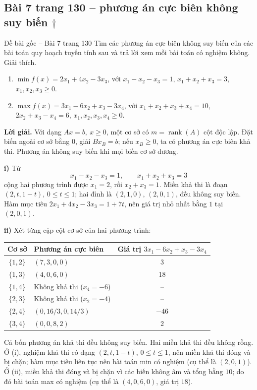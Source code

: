 \documentclass[11pt,a4paper]{article}
\begin{document}
\clearpage
\subsection{Bài 7 trang 130 -- phương án cực biên không suy biến \(\dagger\)}
\begin{questionbox}{Đề bài gốc -- Bài 7 trang 130}
Tìm các phương án cực biên không suy biến của các bài toán quy hoạch tuyến tính sau và trả lời xem mỗi bài toán có nghiệm không. Giải thích.
\begin{enumerate}[label=\roman*),nosep,leftmargin=*]
\item \(\min f(x)=2x_1+4x_2-3x_3\), với \(x_1-x_2-x_3=1\), \(x_1+x_2+x_3=3\), \(x_1,x_2,x_3\ge0\).
\item \(\max f(x)=3x_1-6x_2+x_3-3x_4\), với \(x_1+x_2+x_3+x_4=10\), \(2x_2+x_3-x_4=6\), \(x_1,x_2,x_3,x_4\ge0\).
\end{enumerate}
\end{questionbox}
\textbf{Lời giải.} Với dạng \(Ax=b,\ x\ge0\), một cơ sở có \(m=\operatorname{rank}(A)\) cột độc lập. Đặt biến ngoài cơ sở bằng \(0\), giải \(Bx_B=b\); nếu \(x_B\ge0\), ta có phương án cực biên khả thi. Phương án không suy biến khi mọi biến cơ sở dương.

\textbf{i)} Từ
\[
x_1-x_2-x_3=1,\qquad x_1+x_2+x_3=3
\]
cộng hai phương trình được \(x_1=2\), rồi \(x_2+x_3=1\). Miền khả thi là đoạn \((2,t,1-t)\), \(0\le t\le1\); hai đỉnh là \((2,1,0)\), \((2,0,1)\), đều không suy biến. Hàm mục tiêu \(2x_1+4x_2-3x_3=1+7t\), nên giá trị nhỏ nhất bằng \(1\) tại \((2,0,1)\).

\textbf{ii)} Xét từng cặp cột cơ sở của hai phương trình:
\begin{center}
\begin{tabularx}{.95\textwidth}{c Y c}
\toprule
Cơ sở & Phương án cực biên & Giá trị \(3x_1-6x_2+x_3-3x_4\)\\
\midrule
\(\{1,2\}\) & \((7,3,0,0)\) & 3\\
\(\{1,3\}\) & \((4,0,6,0)\) & 18\\
\(\{1,4\}\) & Không khả thi (\(x_4=-6\)) & --\\
\(\{2,3\}\) & Không khả thi (\(x_2=-4\)) & --\\
\(\{2,4\}\) & \((0,16/3,0,14/3)\) & \(-46\)\\
\(\{3,4\}\) & \((0,0,8,2)\) & 2\\
\bottomrule
\end{tabularx}
\end{center}
Cả bốn phương án khả thi đều không suy biến. Hai miền khả thi đều không rỗng. Ở (i), nghiệm khả thi có dạng \((2,t,1-t)\), \(0\le t\le1\), nên miền khả thi đóng và bị chặn; hàm mục tiêu liên tục nên bài toán min có nghiệm (cụ thể là \((2,0,1)\)). Ở (ii), miền khả thi đóng và bị chặn vì các biến không âm và tổng bằng \(10\); do đó bài toán max có nghiệm (cụ thể là \((4,0,6,0)\), giá trị \(18\)).
\end{document}

